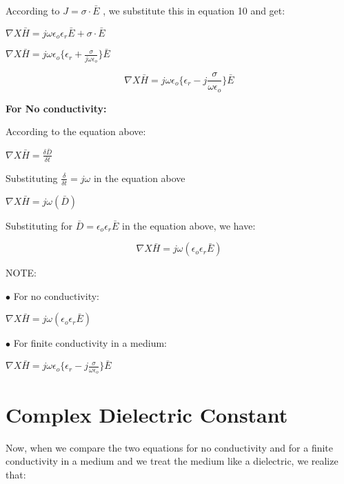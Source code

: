 According to $J = \sigma\cdot\bar{E}$ , we substitute this in equation 10 and get:

\begin{center}
$\nabla X \bar{H} = j\omega\epsilon_{o}\epsilon_{r}\bar{E} + \sigma\cdot\bar{E}$ 
\end{center}

\begin{center}
$\nabla X \bar{H} = j\omega\epsilon_{o}\{\epsilon_{r} + \frac{\sigma}{j\omega\epsilon_{o}}\}\bar{E}$ 
\end{center}

\begin{equation}
\nabla X \bar{H} = j\omega\epsilon_{o}\Bigg\{\epsilon_{r} -j \frac{\sigma}{\omega\epsilon_{o}}\Bigg\}\bar{E} 
\end{equation}

\textbf{For No conductivity:}

According to the equation above:

\begin{center}
$\nabla X \bar{H} = \frac{\delta \bar {D}}{\delta t}$
\end{center}

Substituting $\frac{\delta}{\delta t} = j\omega$ in the equation above

\begin{center}
$\nabla X \bar{H} = j \omega(\bar{D})$
\end{center}

Substituting for $\bar{D} = \epsilon_{o}\epsilon_{r}\bar{E}$ in the equation above, we have:

\begin{equation}
\nabla X \bar{H} = j \omega(\epsilon_{o}\epsilon_{r}\bar{E})
\end{equation}



NOTE: 

$\bullet$ For no conductivity:
\begin{center}
$\nabla X \bar{H} = j \omega(\epsilon_{o}\epsilon_{r}\bar{E})$
\end{center}

$\bullet$ For finite conductivity in a medium:
\begin{center}
$\nabla X \bar{H} = j\omega\epsilon_{o}\bigg\{\epsilon_{r} -j \frac{\sigma}{\omega\epsilon_{o}}\bigg\}\bar{E}$ 
\end{center}

\section{Complex Dielectric Constant}
Now, when we compare the two equations for no conductivity and for a finite conductivity in a medium and we treat the medium like a dielectric, we realize that:

